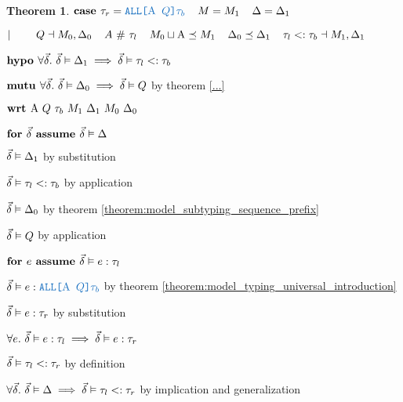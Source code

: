 \documentclass[acmsmall]{acmart}
\theoremstyle{definition}
\newtheorem{theorem}{Theorem}[section]
\begin{document}
\begin{theorem}
    \item \Z $\B{case } 
      \tau_r = \obj{ALL[$\Alpha$ $Q$]$\tau_b$}
      \I
      M = M_1
      \I
      \Delta = \Delta_1
    $
    \item \Z $|\ \ \ \ \ \ \ 
      Q \dashv M_0, \Delta_0
      \hspace{4mm}
      A \ \#\  \tau_l
      \hspace{4mm}
      M_0 \sqcup \mathrm{A} \preceq M_1
      \hspace{4mm}
      \Delta_0 \preceq \Delta_1
      \hspace{4mm}
      \tau_l <: \tau_b
      \dashv M_1, \Delta_1
    $
    \item \Z $\textbf{hypo } 
      \forall \vec{\delta} .\ \vec{\delta} \vDash \Delta_1 \implies \vec{\delta} \vDash \tau_l <: \tau_b 
    $
    \item \Z $\textbf{mutu } 
      \forall \vec{\delta} .\ \vec{\delta} \vDash \Delta_0 \implies \vec{\delta} \vDash Q 
    $ by theorem \ref{...} 
    \item \Z $\B{wrt } \Alpha\ Q\ \tau_b\ M_1\ \Delta_1\ M_0\ \Delta_0$
      \item \Z\Z $\textbf{for } \vec{\delta} \textbf{ assume } \vec{\delta} \vDash \Delta$
        \item \Z\Z\Z $\vec{\delta} \vDash \Delta_1$ by substitution 
        \item \Z\Z\Z $\vec{\delta} \vDash \tau_l <: \tau_b$ by application 
        \item \Z\Z\Z $\vec{\delta} \vDash \Delta_0$ by theorem \ref{theorem:model_subtyping_sequence_prefix} 
        \item \Z\Z\Z $\vec{\delta} \vDash Q$ by application 
        \item \Z\Z\Z $\textbf{for } e \textbf{ assume } \vec{\delta} \vDash e : \tau_l$ 
          \item \Z\Z\Z\Z $\vec{\delta} \satisfies e \hastype \obj{ALL[$\Alpha$ $Q$]$\tau_b$}$ by theorem \ref{theorem:model_typing_universal_introduction} 
          \item \Z\Z\Z\Z $\vec{\delta} \vDash e : \tau_r$ by substitution 
        \item \Z\Z\Z $\forall e .\ \vec{\delta} \vDash e : \tau_l 
          \implies \vec{\delta} \vDash e : \tau_r
        $ 
        \item \Z\Z\Z $\vec{\delta} \vDash \tau_l <: \tau_r$ by definition 
      \item \Z\Z $\forall \vec{\delta} .\ \vec{\delta} \vDash \Delta \implies \vec{\delta} \vDash \tau_l <: \tau_r$ 
      by implication and generalization
      \item \Z\Z {} 


\end{theorem}
\end{document}

